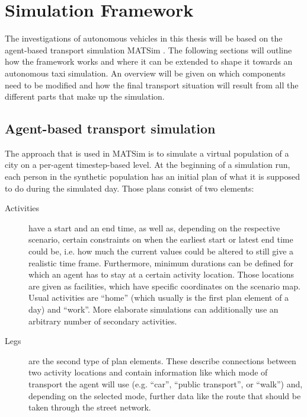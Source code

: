 \section{Simulation Framework}
\label{sec:matsim}

The investigations of autonomous vehicles in this thesis will be based on the
agent-based transport simulation MATSim \citep{Horni2015}. The following sections
will outline how the framework works and where it can be extended to shape it
towards an autonomous taxi simulation. An overview will be given on which components
need to be modified and how the final transport situation will result from all
the different parts that make up the simulation.

\subsection{Agent-based transport simulation}

The approach that is used in MATSim is to simulate a virtual population of a city on a per-agent
timestep-based level. At the beginning of a simulation run, each person in the synthetic
population has an initial plan of what it is supposed to do during the simulated day. Those
 plans consist of two elements:

\begin{description}

\item[Activities] have a start and an end time, as well as, depending on the
respective scenario, certain constraints on when the earliest start or latest
end time could be, i.e. how much the current values could be altered to still
give a realistic time frame. Furthermore, minimum durations can be defined for
which an agent has to stay at a certain activity location. Those locations are
given as facilities, which have specific coordinates on the scenario map.
Usual activities are
``home'' (which usually is the first plan element of a day) and ``work''. More
elaborate simulations can additionally use an arbitrary number of secondary
activities.

\item[Legs] are the second type of plan elements. These describe connections
between two activity locations and contain information like which mode of transport
the agent will use (e.g. ``car'', ``public transport'', or ``walk'') and, depending
on the selected mode, further data like the route that should be taken through
the street network.

\end{description}

